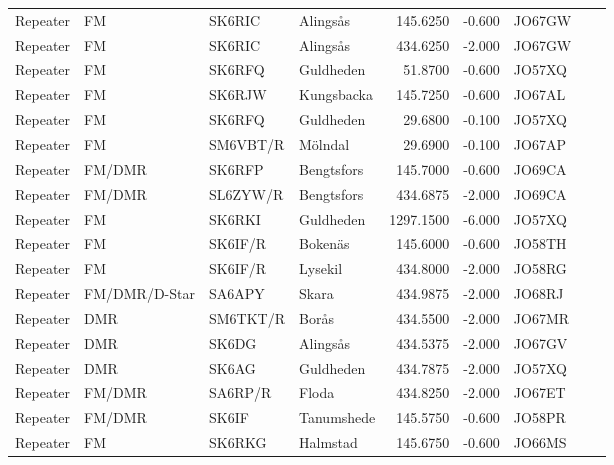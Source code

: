 \begin{longtable}{llllrrlcl}
	Repeater & FM              & SK6RIC   & Alingsås              &   145.6250 &   -0.600 & JO67GW &  &  \\
	Repeater & FM              & SK6RIC   & Alingsås              &   434.6250 &   -2.000 & JO67GW &  &  \\
	Repeater & FM              & SK6RFQ   & Guldheden             &    51.8700 &   -0.600 & JO57XQ &  &  \\
	Repeater & FM              & SK6RJW   & Kungsbacka            &   145.7250 &   -0.600 & JO67AL &  &  \\
	Repeater & FM              & SK6RFQ   & Guldheden             &    29.6800 &   -0.100 & JO57XQ &  &  \\
	Repeater & FM              & SM6VBT/R & Mölndal               &    29.6900 &   -0.100 & JO67AP &  &  \\
	Repeater & FM/DMR          & SK6RFP   & Bengtsfors            &   145.7000 &   -0.600 & JO69CA &  &  \\
	Repeater & FM/DMR          & SL6ZYW/R & Bengtsfors            &   434.6875 &   -2.000 & JO69CA &  &  \\
	Repeater & FM              & SK6RKI   & Guldheden             &  1297.1500 &   -6.000 & JO57XQ &  &  \\
	Repeater & FM              & SK6IF/R  & Bokenäs               &   145.6000 &   -0.600 & JO58TH &  &  \\
	Repeater & FM              & SK6IF/R  & Lysekil               &   434.8000 &   -2.000 & JO58RG &  &  \\
	Repeater & FM/DMR/D-Star   & SA6APY   & Skara                 &   434.9875 &   -2.000 & JO68RJ &  &  \\
	Repeater & DMR             & SM6TKT/R & Borås                 &   434.5500 &   -2.000 & JO67MR &  &  \\
	Repeater & DMR             & SK6DG    & Alingsås              &   434.5375 &   -2.000 & JO67GV &  &  \\
	Repeater & DMR             & SK6AG    & Guldheden             &   434.7875 &   -2.000 & JO57XQ &  &  \\
	Repeater & FM/DMR          & SA6RP/R  & Floda                 &   434.8250 &   -2.000 & JO67ET &  &  \\
	Repeater & FM/DMR          & SK6IF    & Tanumshede            &   145.5750 &   -0.600 & JO58PR &  &  \\
	Repeater & FM              & SK6RKG   & Halmstad              &   145.6750 &   -0.600 & JO66MS &  &  \\

\end{longtable}
